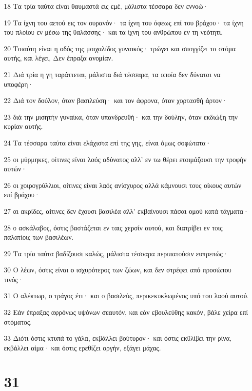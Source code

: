 \par 18 Τα τρία ταύτα είναι θαυμαστά εις εμέ, μάλιστα τέσσαρα δεν εννοώ·
\par 19 Τα ίχνη του αετού εις τον ουρανόν· τα ίχνη του όφεως επί του βράχου· τα ίχνη του πλοίου εν μέσω της θαλάσσης· και τα ίχνη του ανθρώπου εν τη νεότητι.
\par 20 Τοιαύτη είναι η οδός της μοιχαλίδος γυναικός· τρώγει και σπογγίζει το στόμα αυτής, και λέγει, Δεν έπραξα ανομίαν.
\par 21 Διά τρία η γη ταράττεται, μάλιστα διά τέσσαρα, τα οποία δεν δύναται να υποφέρη·
\par 22 Διά τον δούλον, όταν βασιλεύση· και τον άφρονα, όταν χορτασθή άρτον·
\par 23 διά την μισητήν γυναίκα, όταν υπανδρευθή· και την δούλην, όταν εκδιώξη την κυρίαν αυτής.
\par 24 Τα τέσσαρα ταύτα είναι ελάχιστα επί της γης, είναι όμως σοφώτατα·
\par 25 οι μύρμηκες, οίτινες είναι λαός αδύνατος αλλ' εν τω θέρει ετοιμάζουσι την τροφήν αυτών·
\par 26 οι χοιρογρύλλιοι, οίτινες είναι λαός ανίσχυρος αλλά κάμνουσι τους οίκους αυτών επί βράχου·
\par 27 αι ακρίδες, αίτινες δεν έχουσι βασιλέα αλλ' εκβαίνουσι πάσαι ομού κατά τάγματα·
\par 28 ο ασκάλαβος, όστις βαστάζεται εν ταις χερσίν αυτού, και διατρίβει εν τοις παλατίοις των βασιλέων.
\par 29 Τα τρία ταύτα βαδίζουσι καλώς, μάλιστα τέσσαρα περιπατούσιν ευπρεπώς·
\par 30 Ο λέων, όστις είναι ο ισχυρότερος των ζώων, και δεν στρέφει από προσώπου τινός·
\par 31 Ο αλέκτωρ, ο τράγος έτι· και ο βασιλεύς, περικεκυκλωμένος υπό του λαού αυτού.
\par 32 Εάν έπραξας αφρόνως υψόνων σεαυτόν, και εάν εβουλεύθης κακόν, βάλε χείρα επί στόματος.
\par 33 Διότι όστις κτυπά το γάλα, εκβάλλει βούτυρον· και όστις εκθλίβει την ρίνα, εκβάλλει αίμα· και όστις ερεθίζει οργήν, εξάγει μάχας.

\chapter{31}

